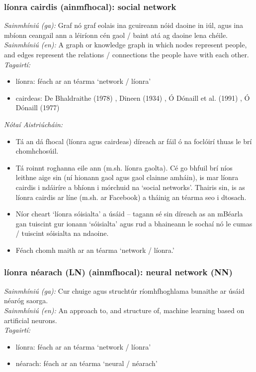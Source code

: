 \subsubsection*{líonra cairdis (ainmfhocal): social network}
 \noindent \textit{Sainmhíniú (ga):} Graf nó graf eolais ina gcuireann nóid daoine in iúl, agus ina mbíonn ceangail ann a léiríonn cén gaol / baint atá ag daoine lena chéile.
\\
 \noindent \textit{Sainmhíniú (en):} A graph or knowledge graph in which nodes represent people, and edges represent the relations / connections the people have with each other.
\\
 \noindent \textit{Tagairtí:}
\begin{itemize}
	\item líonra: féach ar an téarma `network / líonra'
	\item cairdeas: De Bhaldraithe (1978) \cite{de-bhaldraithe}, Dineen (1934) \cite{dineen}, Ó Dónaill et al. (1991) \cite{focloir-beag}, Ó Dónaill (1977) \cite{odonaill}
\end{itemize}

 \noindent \textit{Nótaí Aistriúcháin:}
\begin{itemize}
	\item Tá an dá fhocal (líonra agus cairdeas) díreach ar fáil ó na foclóirí thuas le brí chomhchosúil.
	\item Tá roinnt roghanna eile ann (m.sh. líonra gaolta). Cé go bhfuil brí níos leithne aige sin (ní hionann gaol agus gaol clainne amháin), is mar líonra cairdis i ndáiríre a bhíonn i mórchuid na `social networks'. Thairis sin, is as líonra cairdis ar líne (m.sh. ar Facebook) a tháinig an téarma seo i dtosach.
	\item Níor cheart `líonra sóisialta' a úsáid -- tagann sé sin díreach as an mBéarla gan tuiscint gur ionann `sóisialta' agus rud a bhaineann le sochaí nó le cumas / tuiscint sóisialta na ndaoine.
	\item Féach chomh maith ar an téarma `network / líonra.'
\end{itemize}


\subsubsection*{líonra néarach (LN) (ainmfhocal): neural network (NN)}
 \noindent \textit{Sainmhíniú (ga):} Cur chuige agus struchtúr ríomhfhoghlama bunaithe ar úsáid néaróg saorga.
\\
 \noindent \textit{Sainmhíniú (en):} An approach to, and structure of, machine learning based on artificial neurons.
\\
 \noindent \textit{Tagairtí:}
\begin{itemize}
	\item líonra: féach ar an téarma `network / líonra'
	\item néarach: féach ar an téarma `neural / néarach'
\end{itemize}

